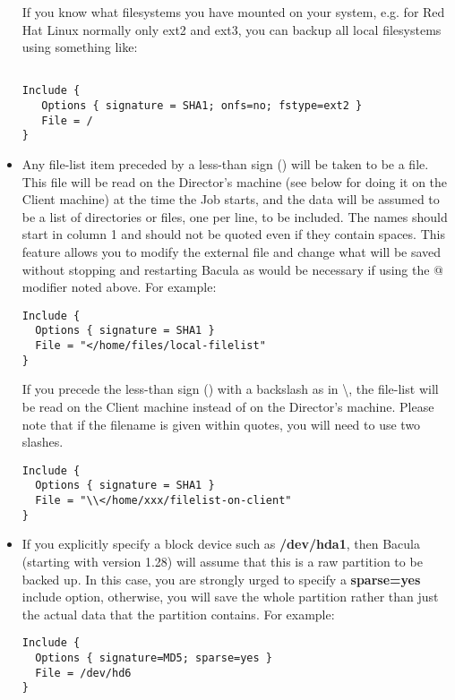 \begin{itemize}
   If you know what filesystems you have mounted on your system, e.g. 
   for Red Hat Linux normally only ext2 and ext3, you can backup
   all local filesystems using something like:

\footnotesize
\begin{verbatim}
 
Include {
   Options { signature = SHA1; onfs=no; fstype=ext2 }
   File = /
}
\end{verbatim}
\normalsize


\item Any file-list item preceded by a less-than sign (\lt{})  will be taken
   to be a file. This file will be read on the Director's machine (see
   below for doing it on the Client machine) at the time
   the Job starts, and the  data will be assumed to be a list of directories or
   files,  one per line, to be included. The names should start in  column 1 and
   should not be quoted even if they contain  spaces. This feature allows you to
   modify the external  file and change what will be saved without stopping and 
   restarting Bacula as would be necessary if using the @  modifier noted above.
   For example: 

\footnotesize
\begin{verbatim}
Include {
  Options { signature = SHA1 }
  File = "</home/files/local-filelist"
}
\end{verbatim}
\normalsize

   If you precede the less-than sign (\lt{}) with a backslash as in
   \textbackslash{}\lt{}, the file-list will be read on the Client machine
   instead of on the Director's machine.  Please note that if the filename
   is given within quotes, you will need to use two slashes.

\footnotesize
\begin{verbatim}
Include {
  Options { signature = SHA1 }
  File = "\\</home/xxx/filelist-on-client"
}
\end{verbatim}
\normalsize

\item If you explicitly specify a block device such as {\bf /dev/hda1},  then
   Bacula (starting with version 1.28) will assume that this  is a raw partition
   to be backed up. In this case, you are strongly  urged to specify a {\bf
   sparse=yes} include option, otherwise, you  will save the whole partition
   rather than just the actual data that  the partition contains. For example: 

\footnotesize
\begin{verbatim}
Include {
  Options { signature=MD5; sparse=yes }
  File = /dev/hd6
}
\end{verbatim}
\normalsize


\end{itemize}
